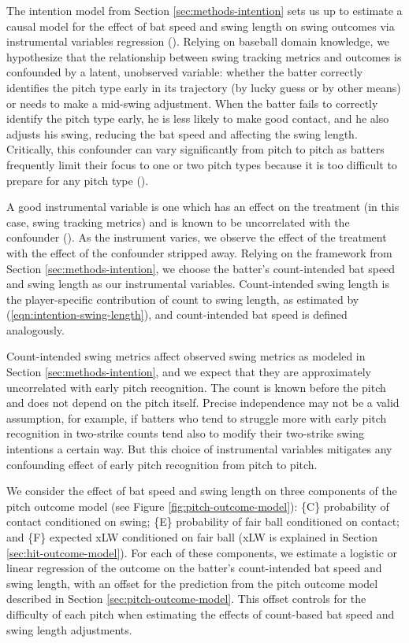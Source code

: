 \documentclass{article}
\begin{document}
      The intention model from Section \ref{sec:methods-intention} sets us up to estimate a causal model for the effect of bat speed and swing length on swing outcomes via instrumental variables regression (\cite{bollen_instrumental_2012}). Relying on baseball domain knowledge, we hypothesize that the relationship between swing tracking metrics and outcomes is confounded by a latent, unobserved variable: whether the batter correctly identifies the pitch type early in its trajectory (by lucky guess or by other means) or needs to make a mid-swing adjustment. When the batter fails to correctly identify the pitch type early, he is less likely to make good contact, and he also adjusts his swing, reducing the bat speed and affecting the swing length. Critically, this confounder can vary significantly from pitch to pitch as batters frequently limit their focus to one or two pitch types because it is too difficult to prepare for any pitch type (\cite{gray_markov_2002}).

      A good instrumental variable is one which has an effect on the treatment (in this case, swing tracking metrics) and is known to be uncorrelated with the confounder (\cite{bollen_instrumental_2012}). As the instrument varies, we observe the effect of the treatment with the effect of the confounder stripped away. Relying on the framework from Section \ref{sec:methods-intention}, we choose the batter's count-intended bat speed and swing length as our instrumental variables. Count-intended swing length is the player-specific contribution of count to swing length, as estimated by (\ref{eqn:intention-swing-length}), and count-intended bat speed is defined analogously.

      Count-intended swing metrics affect observed swing metrics as modeled in Section \ref{sec:methods-intention}, and we expect that they are approximately uncorrelated with early pitch recognition. The count is known before the pitch and does not depend on the pitch itself. Precise independence may not be a valid assumption, for example, if batters who tend to struggle more with early pitch recognition in two-strike counts tend also to modify their two-strike swing intentions a certain way. But this choice of instrumental variables mitigates any confounding effect of early pitch recognition from pitch to pitch.

      We consider the effect of bat speed and swing length on three components of the pitch outcome model (see Figure \ref{fig:pitch-outcome-model}): \{C\} probability of contact conditioned on swing; \{E\} probability of fair ball conditioned on contact; and \{F\} expected xLW conditioned on fair ball (xLW is explained in Section \ref{sec:hit-outcome-model}). For each of these components, we estimate a logistic or linear regression of the outcome on the batter's count-intended bat speed and swing length, with an offset for the prediction from the pitch outcome model described in Section \ref{sec:pitch-outcome-model}. This offset controls for the difficulty of each pitch when estimating the effects of count-based bat speed and swing length adjustments.
\end{document}
